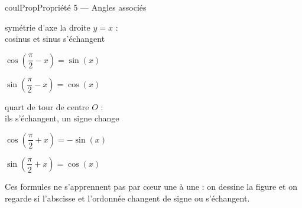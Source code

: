 \documentclass[11pt,a4paper]{article}
\makeatletter
\newcounter{lycee@signet}
\newcommand{\signet}[3][]{\stepcounter{lycee@signet}%
  \edef\lycee@dest{\if\relax\detokenize{#1}\relax
    signet.\arabic{lycee@signet}\else#1\fi}%
  \hypertarget{\lycee@dest}{}\bookmark[level=#2,dest=\lycee@dest]{#3}}
\newenvironment{proprietebox}[1][Propriété]%
  {\begin{boitecours}[phantom={\signet{2}{#1}}]{coulProp}{#1}}{\end{boitecours}}
\makeatother
\begin{document}
\begin{proprietebox}[Propriété 5 --- Angles associés]
\medskip
\bigskip
\hfill
\begin{minipage}[t]{0.32\linewidth}\centering
{}\par
{\small symétrie d'axe la droite $y=x$ :\\ cosinus et sinus s'échangent}\par\smallskip
$\cos\left(\dfrac{\pi}{2}-x\right)=\sin(x)$\par\smallskip
$\sin\left(\dfrac{\pi}{2}-x\right)=\cos(x)$
\end{minipage}\hspace{1.5cm}
\begin{minipage}[t]{0.32\linewidth}\centering
{}\par
{\small quart de tour de centre $O$ :\\ ils s'échangent, un signe change}\par\smallskip
$\cos\left(\dfrac{\pi}{2}+x\right)=-\sin(x)$\par\smallskip
$\sin\left(\dfrac{\pi}{2}+x\right)=\cos(x)$
\end{minipage}
\hfill\null

\medskip
Ces formules ne s'apprennent pas par cœur une à une : on dessine la figure et on regarde
si l'abscisse et l'ordonnée changent de signe ou s'échangent.
\end{proprietebox}
\end{document}
